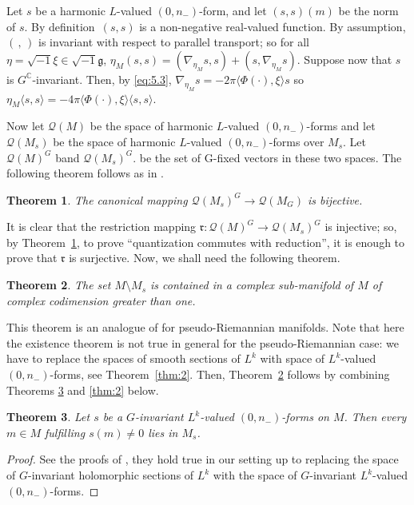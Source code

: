 \documentclass[pdftex]{sigma}
\numberwithin{equation}{section}
\newtheorem{Theorem}{Theorem}[section]
\begin{document}
 	Let $s$ be a harmonic $L$-valued $(0,n_-)$-form, and let $(s, s)(m)$ be the norm of $s$. By definition~$(s,s)$ is a non-negative real-valued function. By assumption, $( \,,\, )$ is invariant with respect to parallel transport; so for all $\eta=\sqrt{-1} \xi\in \sqrt{-1}\mathfrak{g}$,
$\eta_M (s,s)=(\nabla_{\eta_M}s, s)+(s, \nabla_{\eta_M}s)$.
 	Suppose now that $s$ is $G^{\mathbb{C}}$-invariant. Then, by \eqref{eq:5.3},
 	$\nabla_{\eta_M} s=-2\pi \langle\Phi(\cdot), {\xi}\rangle s$
 	so
 	$\eta_M\langle s, s \rangle=-4\pi \langle\Phi(\cdot), {\xi}\rangle \langle s, s\rangle $.
 	
 	Now let $\mathcal{Q}(M)$ be the space of harmonic $L$-valued $(0,n_-)$-forms and let $\mathcal{Q}(M_s)$ be the space of harmonic $L$-valued $(0,n_-)$-forms over $M_s$. Let $\mathcal{Q}(M)^G$ band $\mathcal{Q}(M_s)^G$. be the set of G-fixed vectors in these two spaces. The following theorem follows as in \cite[Theorem 5.2]{gs}.
 	
 	\begin{Theorem} \label{thm:5.2}
 		The canonical mapping $\mathcal{Q}(M_s)^G \rightarrow \mathcal{Q}(M_G)$ is bijective.
 	\end{Theorem}
 	
 	It is clear that the restriction mapping $\mathfrak{r} \colon \mathcal{Q}(M)^G \rightarrow \mathcal{Q}(M_s)^G$ is injective; so, by Theorem~\ref{thm:5.2}, to prove ``quantization commutes with reduction'', it is enough to prove that $\mathfrak{r}$ is surjective. Now, we shall need the following theorem.
 	
 	\begin{Theorem} \label{thm:openanddense}
 		The set $M\setminus M_s$ is contained in a complex sub-manifold of $M$ of complex codimension greater than one.
 	\end{Theorem}

 	This theorem is an analogue of \cite[Theorem 5.7]{gs} for pseudo-Riemannian manifolds. Note that here the existence theorem \cite[Theorem 5.6]{gs} is not true in general for the pseudo-Riemannian case: we have to replace the spaces of smooth sections of $L^k$ with space of $L^k$-valued $(0, n_-)$-forms, see Theorem~\ref{thm:2}. Then, Theorem~\ref{thm:openanddense} follows by combining Theorems \ref{thm:1} and \ref{thm:2} below.
 	
 	\begin{Theorem} \label{thm:1}
 		Let $s$ be a $G$-invariant $L^k$-valued $(0, n_-)$-forms on $M$. Then every $m\in M$ fulfilling $s(m)\neq 0$ lies in $M_s$.
 	\end{Theorem}
 	\begin{proof}
 		See the proofs of \cite[Theorems 5.3 and 5.4]{gs}, they hold true in our setting up to replacing the space of $G$-invariant holomorphic sections of $L^k$ with the space of $G$-invariant $L^k$-valued $(0, n_-)$-forms.
 	\end{proof}
\end{document}
